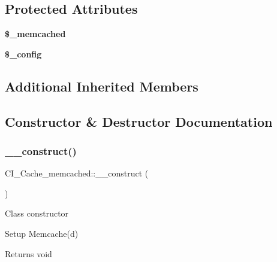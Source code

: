 \subsection*{Protected Attributes}
\begin{DoxyCompactItemize}
\item 
\mbox{\label{class_c_i___cache__memcached_a8eb01ae5f1c85dbd6dab4471dbbb5647}} 
{\bfseries \$\+\_\+memcached}
\item 
{\bfseries \$\+\_\+config}
\end{DoxyCompactItemize}
\subsection*{Additional Inherited Members}


\subsection{Constructor \& Destructor Documentation}
\mbox{\label{class_c_i___cache__memcached_a0e640c05dd6df6ec5172cc8853d65f22}} 
\subsubsection{\texorpdfstring{\+\_\+\+\_\+construct()}{\_\_construct()}}
{\footnotesize\ttfamily C\+I\+\_\+\+Cache\+\_\+memcached\+::\+\_\+\+\_\+construct (\begin{DoxyParamCaption}{ }\end{DoxyParamCaption})}

Class constructor

Setup Memcache(d)

\begin{DoxyReturn}{Returns}
void 
\end{DoxyReturn}
\mbox{\label{class_c_i___cache__memcached_a726fd00d09d51bd2b42a731e831d2262}} 
